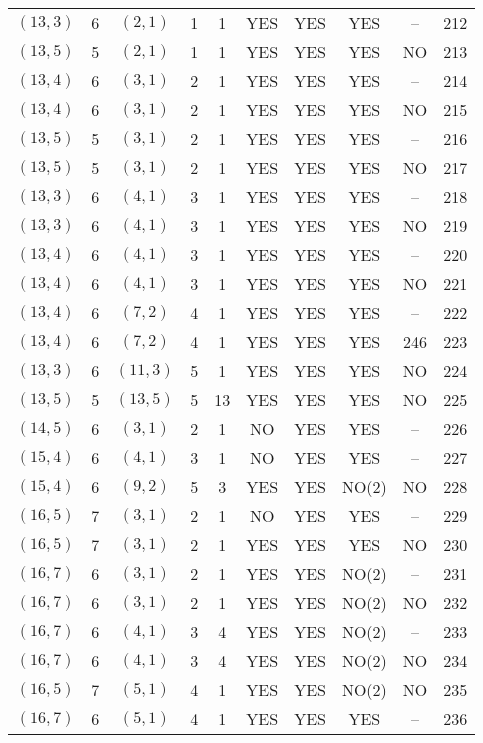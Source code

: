 \begin{longtable}{|c|c|c|c|c|c|c|c|c|c|}
$(13, 3)$ & 6 & $(2, 1)$ & 1 & 1 & YES & YES & YES & -- & 212\\
$(13, 5)$ & 5 & $(2, 1)$ & 1 & 1 & YES & YES & YES & NO & 213\\
$(13, 4)$ & 6 & $(3, 1)$ & 2 & 1 & YES & YES & YES & -- & 214\\
$(13, 4)$ & 6 & $(3, 1)$ & 2 & 1 & YES & YES & YES & NO & 215\\
$(13, 5)$ & 5 & $(3, 1)$ & 2 & 1 & YES & YES & YES & -- & 216\\
$(13, 5)$ & 5 & $(3, 1)$ & 2 & 1 & YES & YES & YES & NO & 217\\
$(13, 3)$ & 6 & $(4, 1)$ & 3 & 1 & YES & YES & YES & -- & 218\\
$(13, 3)$ & 6 & $(4, 1)$ & 3 & 1 & YES & YES & YES & NO & 219\\
$(13, 4)$ & 6 & $(4, 1)$ & 3 & 1 & YES & YES & YES & -- & 220\\
$(13, 4)$ & 6 & $(4, 1)$ & 3 & 1 & YES & YES & YES & NO & 221\\
$(13, 4)$ & 6 & $(7, 2)$ & 4 & 1 & YES & YES & YES & -- & 222\\
$(13, 4)$ & 6 & $(7, 2)$ & 4 & 1 & YES & YES & YES & 246 & 223\\
$(13, 3)$ & 6 & $(11, 3)$ & 5 & 1 & YES & YES & YES & NO & 224\\
$(13, 5)$ & 5 & $(13, 5)$ & 5 & 13 & YES & YES & YES & NO & 225\\
$(14, 5)$ & 6 & $(3, 1)$ & 2 & 1 & NO & YES & YES & -- & 226\\
$(15, 4)$ & 6 & $(4, 1)$ & 3 & 1 & NO & YES & YES & -- & 227\\
$(15, 4)$ & 6 & $(9, 2)$ & 5 & 3 & YES & YES & NO(2) & NO & 228\\
$(16, 5)$ & 7 & $(3, 1)$ & 2 & 1 & NO & YES & YES & -- & 229\\
$(16, 5)$ & 7 & $(3, 1)$ & 2 & 1 & YES & YES & YES & NO & 230\\
$(16, 7)$ & 6 & $(3, 1)$ & 2 & 1 & YES & YES & NO(2) & -- & 231\\
$(16, 7)$ & 6 & $(3, 1)$ & 2 & 1 & YES & YES & NO(2) & NO & 232\\
$(16, 7)$ & 6 & $(4, 1)$ & 3 & 4 & YES & YES & NO(2) & -- & 233\\
$(16, 7)$ & 6 & $(4, 1)$ & 3 & 4 & YES & YES & NO(2) & NO & 234\\
$(16, 5)$ & 7 & $(5, 1)$ & 4 & 1 & YES & YES & NO(2) & NO & 235\\
$(16, 7)$ & 6 & $(5, 1)$ & 4 & 1 & YES & YES & YES & -- & 236\\

\end{longtable}
